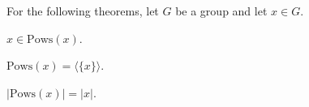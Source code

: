 For the following theorems, let $G$ be a group and let $x \in G$.

\begin{theorem}
    \label{theorem : Pows_contain_self}
    \leanok
    $x \in \text{Pows}(x)$.
\end{theorem}

\begin{theorem}
    \label{theorem : Pows_eq_Generate_singleton}
    \leanok
    $\text{Pows}(x) = \langle \{x\} \rangle$.
\end{theorem}

\begin{theorem}
    \label{theorem : Pows_card_eq_order}
    \leanok
    $|\text{Pows}(x)| = |x|$.
\end{theorem}
